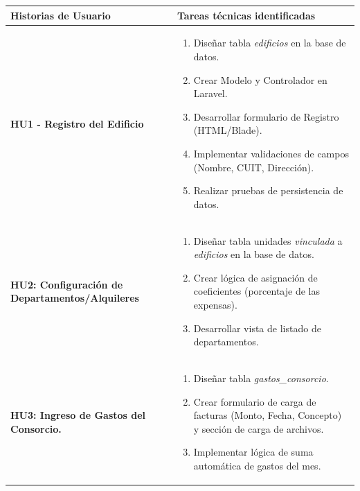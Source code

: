 \begin{longtable}{|p{4.5cm}|p{10.5cm}|}
    \hline
    \textbf{Historias de Usuario} & \textbf{Tareas técnicas identificadas}
    \\ \hline
    \endhead

        \textbf{HU1 - Registro del Edificio} 
        
        & 

            \begin{enumerate}[leftmargin=*,nosep]
                \item Diseñar tabla \textit{edificios} en la base de datos.
                \item Crear Modelo y Controlador en Laravel.
                \item Desarrollar formulario de Registro (HTML/Blade).
                \item Implementar validaciones de campos (Nombre, CUIT, Dirección).
                \item Realizar pruebas de persistencia de datos.
            \end{enumerate} 
        
    \\ \hline

        \textbf{HU2: Configuración de Departamentos/Alquileres} 
        
        & 

            \begin{enumerate}[leftmargin=*,nosep]
                \item Diseñar tabla unidades \textit{vinculada} a \textit{edificios} en la base de datos.
                \item Crear lógica de asignación de coeficientes (porcentaje de las expensas).
                \item Desarrollar vista de listado de departamentos.
            \end{enumerate} 
        
    \\ \hline

        \textbf{HU3: Ingreso de Gastos del Consorcio.} 
        
        & 

            \begin{enumerate}[leftmargin=*,nosep]
                \item Diseñar tabla \textit{gastos\_consorcio}.
                \item Crear formulario de carga de facturas (Monto, Fecha, Concepto) y sección de carga de archivos.
                \item Implementar lógica de suma automática de gastos del mes.
            \end{enumerate} 
        

\end{longtable}
